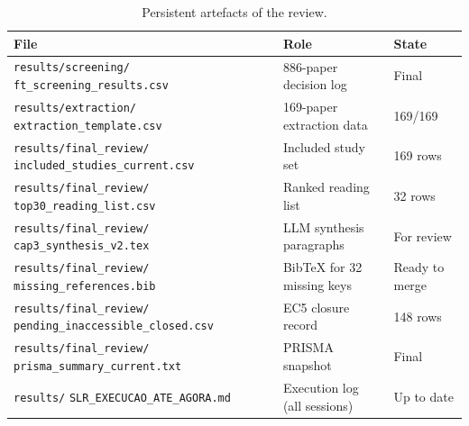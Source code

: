 \begin{table}[htbp]
\centering
\caption{Persistent artefacts of the review.}
\label{tab:app-artefacts}
\small
\setlength{\tabcolsep}{3pt}
\begin{tabular}{p{6.5cm} p{3.0cm} p{2.8cm}}
\toprule
\textbf{File} & \textbf{Role} & \textbf{State} \\
\midrule
\texttt{results/screening/} \texttt{ft\_screening\_results.csv}
  & 886-paper decision log & Final \\[3pt]
\texttt{results/extraction/} \texttt{extraction\_template.csv}
  & 169-paper extraction data & 169/169 \\[3pt]
\texttt{results/final\_review/} \texttt{included\_studies\_current.csv}
  & Included study set & 169 rows \\[3pt]
\texttt{results/final\_review/} \texttt{top30\_reading\_list.csv}
  & Ranked reading list & 32 rows \\[3pt]
\texttt{results/final\_review/} \texttt{cap3\_synthesis\_v2.tex}
  & LLM synthesis paragraphs & For review \\[3pt]
\texttt{results/final\_review/} \texttt{missing\_references.bib}
  & BibTeX for 32 missing keys & Ready to merge \\[3pt]
\texttt{results/final\_review/} \texttt{pending\_inaccessible\_closed.csv}
  & EC5 closure record & 148 rows \\[3pt]
\texttt{results/final\_review/} \texttt{prisma\_summary\_current.txt}
  & PRISMA snapshot & Final \\[3pt]
\texttt{results/} \texttt{SLR\_EXECUCAO\_ATE\_AGORA.md}
  & Execution log (all sessions) & Up to date \\
\bottomrule
\end{tabular}
\end{table}
